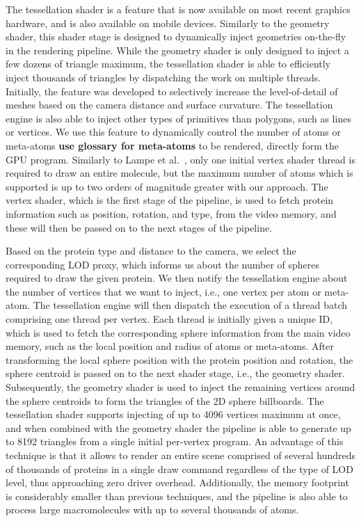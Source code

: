 The tessellation shader is a feature that is now available on most recent graphics hardware, and is also available on mobile devices.
Similarly to the geometry shader, this shader stage is designed to dynamically inject geometries on-the-fly in the rendering pipeline.
While the geometry shader is only designed to inject a few dozens of triangle maximum, the tessellation shader is able to efficiently inject thousands of triangles by dispatching the work on multiple threads.
Initially, the feature was developed to selectively increase the level-of-detail of meshes based on the camera distance and surface curvature.
The tessellation engine is also able to inject other types of primitives than polygons, such as lines or vertices.
We use this feature to dynamically control the number of atoms or meta-atoms \textbf{use glossary for meta-atoms} to be rendered, directly form the GPU program.
Similarly to Lampe et al.~\cite{lampe2007two}, only one initial vertex shader thread is required to draw an entire molecule, but the maximum number of atoms which is supported is up to two orders of magnitude greater with our approach.
The vertex shader, which is the first stage of the pipeline, is used to fetch protein information such as position, rotation, and type, from the video memory, and these will then be passed on to the next stages of the pipeline.

Based on the protein type and distance to the camera, we select the corresponding LOD proxy, which informs us about the number of spheres required to draw the given protein.
We then notify the tessellation engine about the number of vertices that we want to inject, i.e., one vertex per atom or meta-atom.
The tessellation engine will then dispatch the execution of a thread batch comprising one thread per vertex.
Each thread is initially given a unique ID, which is used to fetch the corresponding sphere information from the main video memory, such as the local position and radius of atoms or meta-atoms.
After transforming the local sphere position with the protein position and rotation, the sphere centroid is passed on to the next shader stage, i.e., the geometry shader.
Subsequently, the geometry shader is used to inject the remaining vertices around the sphere centroids to form the triangles of the 2D sphere billboards.
The tessellation shader supports injecting of up to 4096 vertices maximum at once, and when combined with the geometry shader the pipeline is able to generate up to 8192 triangles from a single initial per-vertex program.
An advantage of this technique is that it allows to render an entire scene comprised of several hundreds of thousands of proteins in a single draw command regardless of the type of LOD level, thus approaching zero driver overhead.
Additionally, the memory footprint is considerably smaller than previous techniques, and the pipeline is also able to process large macromolecules with up to several thousands of atoms.

